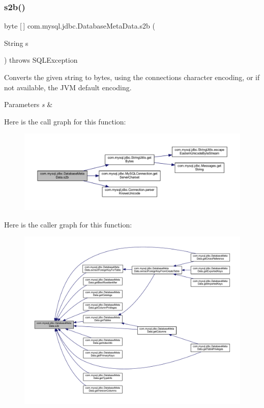 \subsubsection{\texorpdfstring{s2b()}{s2b()}}
{\footnotesize\ttfamily byte \mbox{[}$\,$\mbox{]} com.\+mysql.\+jdbc.\+Database\+Meta\+Data.\+s2b (\begin{DoxyParamCaption}\item[{String}]{s }\end{DoxyParamCaption}) throws S\+Q\+L\+Exception\hspace{0.3cm}{\ttfamily [protected]}}

Converts the given string to bytes, using the connection\textquotesingle{}s character encoding, or if not available, the J\+VM default encoding.


\begin{DoxyParams}{Parameters}
{\em s} & \\
\hline
\end{DoxyParams}
Here is the call graph for this function\+:
\nopagebreak
\begin{figure}[H]
\begin{center}
\leavevmode
\includegraphics[width=350pt]{classcom_1_1mysql_1_1jdbc_1_1_database_meta_data_acb5737394e592106fb3bc229341836e7_cgraph}
\end{center}
\end{figure}
Here is the caller graph for this function\+:
\nopagebreak
\begin{figure}[H]
\begin{center}
\leavevmode
\includegraphics[width=350pt]{classcom_1_1mysql_1_1jdbc_1_1_database_meta_data_acb5737394e592106fb3bc229341836e7_icgraph}
\end{center}
\end{figure}
